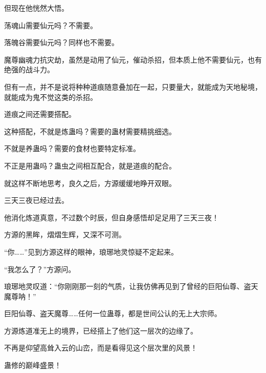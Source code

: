 \begin{this_body}
但现在他恍然大悟。

荡魂山需要仙元吗？不需要。

落魄谷需要仙元吗？同样也不需要。

魔尊幽魂力抗灾劫，虽然是动用了仙元，催动杀招，但本质上他不需要仙元，也有绝强的战斗力。

但有一点，并不是说将种种道痕随意叠加在一起，只要量大，就能成为天地秘境，就能成为鬼不觉这类的杀招。

道痕之间还需要搭配。

这种搭配，不就是炼蛊吗？需要的蛊材需要精挑细选。

不就是养蛊吗？需要的食材也要特定标准。

不正是用蛊吗？蛊虫之间相互配合，就是道痕的配合。

就这样不断地思考，良久之后，方源缓缓地睁开双眼。

三天三夜已经过去。

他消化炼道真意，不过数个时辰，但自身感悟却足足用了三天三夜！

方源的黑眸，熠熠生辉，又深不可测。

“你……”见到方源这样的眼神，琅琊地灵惊疑不定起来。

“我怎么了？”方源问。

琅琊地灵叹道：“你刚刚那一刻的气质，让我仿佛再见到了曾经的巨阳仙尊、盗天魔尊呐！”

巨阳仙尊、盗天魔尊……任何一位蛊尊，都是世间公认的无上大宗师。

方源炼道准无上的境界，已经搭上了他们这一层次的边缘了。

不再是仰望高耸入云的山峦，而是看得见这个层次里的风景！

蛊修的巅峰盛景！

\end{this_body}


